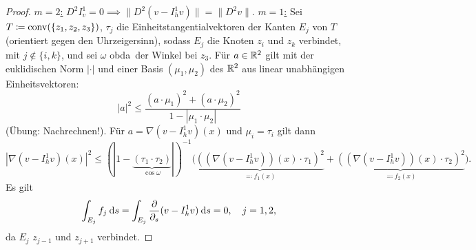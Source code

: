 \documentclass[../skript.tex]{subfiles}
\begin{document}
\begin{proof}
	\underline{$m=2$:} $D^2 I^1_v = 0 \implies \| D^2(v-I_h^1 v)\| = \|D^2 v\|$.
	\underline{$m=1$:} Sei $T \coloneqq \operatorname{conv}(\{z_1,z_2,z_3\})$, $\tau_j$ die Einheitstangentialvektoren der Kanten $E_j$ von $T$ (orientiert gegen den Uhrzeigersinn), sodass $E_j$ die Knoten $z_i$ und $z_k$ verbindet, mit $j\not\in\{i,k\}$, und sei $\omega$ \ac{obda}\ der Winkel bei $z_3$. Für $a\in\mathbb{R}^2$ gilt mit der euklidischen Norm $|\cdot|$ und einer Basis $(\mu_1,\mu_2)$ des $\mathbb{R}^2$ aus linear unabhängigen Einheitsvektoren:
	\[
		| a|^2 \leq \frac{(a\cdot\mu_1)^2 + (a\cdot\mu_2)^2}{1- |\mu_1\cdot\mu_2|}
	\]
	(Übung: Nachrechnen!). 
	Für $a = \nabla(v-I_h^1 v)(x)$ und $\mu_i = \tau_i$ gilt dann
	\[
		|\nabla(v-I_h^1 v)(x)|^2\leq (| 1-\underbrace{(\tau_1\cdot\tau_2)}_{\cos{\omega}}| )^{-1}\big( \underbrace{((\nabla(v-I_h^1 v))(x)\cdot\tau_1 )^2}_{\eqqcolon f_1(x)} + \underbrace{( (\nabla(v-I_h^1 v))(x)\cdot\tau_2 )^2}_{\eqqcolon f_2(x)} \big).
	\] 
	Es gilt
	\[
		\int_{E_j} f_j \:\mathrm{d}s = \int_{E_j}\frac{\partial}{\partial_s}(v-I_h^1 v) \:\mathrm{d}s = 0,\quad j=1,2,
	\]
	da $E_j$ $z_{j-1}$ und $z_{j+1}$ verbindet.


\end{proof}
\end{document}
